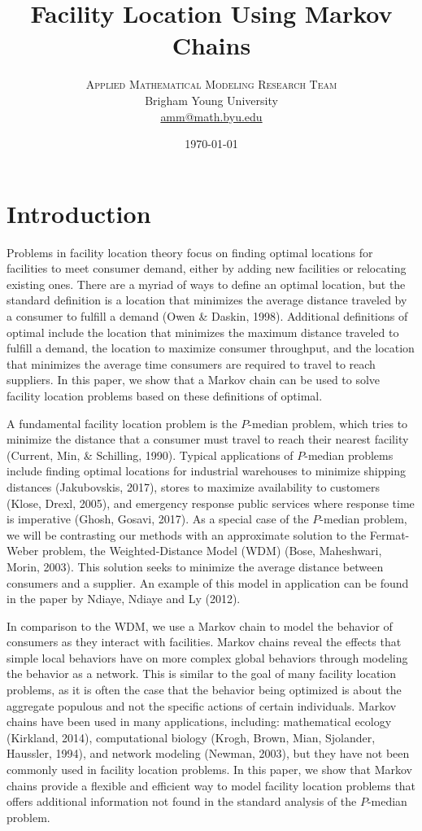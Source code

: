 \documentclass[twoside,twocolumn]{article}
\title{Facility Location Using Markov Chains}
\author{
\textsc{Applied Mathematical Modeling Research Team}\\[1ex]
\normalsize Brigham Young University \\
\normalsize \href{mailto:amm@math.byu.edu}{amm@math.byu.edu}
}
\date{\today}
\begin{document}
\maketitle

\section{Introduction}

Problems in facility location theory focus on finding optimal locations for facilities to meet consumer demand, either by adding new facilities or relocating existing ones.
There are a myriad of ways to define an optimal location, but the standard definition is a location that minimizes the average distance traveled by a consumer to fulfill a demand (Owen \& Daskin, 1998).
Additional definitions of optimal include the location that minimizes the maximum distance traveled to fulfill a demand, the location to maximize consumer throughput, and the location that minimizes the average time consumers are required to travel to reach suppliers.
In this paper, we show that a Markov chain can be used to solve facility location problems based on these definitions of optimal.

A fundamental facility location problem is the $P$-median problem, which tries to minimize the distance that a consumer must travel to reach their nearest facility (Current, Min, \& Schilling, 1990).
Typical applications of $P$-median problems include finding optimal locations for industrial warehouses to minimize shipping distances (Jakubovskis, 2017), stores to maximize availability to customers (Klose, Drexl, 2005), and emergency response public services where response time is imperative (Ghosh, Gosavi, 2017).
As a special case of the $P$-median problem, we will be contrasting our methods with an approximate solution to the Fermat-Weber problem, the Weighted-Distance Model (WDM) (Bose, Maheshwari, Morin, 2003).
This solution seeks to minimize the average distance between consumers and a supplier.
An example of this model in application can be found in the paper by Ndiaye, Ndiaye and Ly (2012).

In comparison to the WDM, we use a Markov chain to model the behavior of consumers as they interact with facilities. 
Markov chains reveal the effects that simple local behaviors have on more complex global behaviors through modeling the behavior as a network.
This is similar to the goal of many facility location problems, as it is often the case that the behavior being optimized is about the aggregate populous and not the specific actions of certain individuals.
Markov chains have been used in many applications, including: mathematical ecology (Kirkland, 2014), computational biology (Krogh, Brown, Mian, Sjolander, Haussler, 1994), and network modeling (Newman, 2003), but they have not been commonly used in facility location problems.
In this paper, we show that Markov chains provide a flexible and efficient way to model facility location problems that offers additional information not found in the standard analysis of the $P$-median problem.
\end{document}
